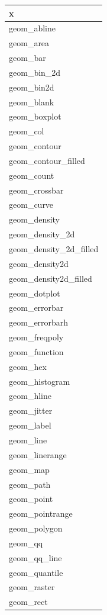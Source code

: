 \documentclass[
]{book}
\begin{document}
\begin{tabular}{l}
\hline
x\\
\hline
geom\_abline\\
\hline
geom\_area\\
\hline
geom\_bar\\
\hline
geom\_bin\_2d\\
\hline
geom\_bin2d\\
\hline
geom\_blank\\
\hline
geom\_boxplot\\
\hline
geom\_col\\
\hline
geom\_contour\\
\hline
geom\_contour\_filled\\
\hline
geom\_count\\
\hline
geom\_crossbar\\
\hline
geom\_curve\\
\hline
geom\_density\\
\hline
geom\_density\_2d\\
\hline
geom\_density\_2d\_filled\\
\hline
geom\_density2d\\
\hline
geom\_density2d\_filled\\
\hline
geom\_dotplot\\
\hline
geom\_errorbar\\
\hline
geom\_errorbarh\\
\hline
geom\_freqpoly\\
\hline
geom\_function\\
\hline
geom\_hex\\
\hline
geom\_histogram\\
\hline
geom\_hline\\
\hline
geom\_jitter\\
\hline
geom\_label\\
\hline
geom\_line\\
\hline
geom\_linerange\\
\hline
geom\_map\\
\hline
geom\_path\\
\hline
geom\_point\\
\hline
geom\_pointrange\\
\hline
geom\_polygon\\
\hline
geom\_qq\\
\hline
geom\_qq\_line\\
\hline
geom\_quantile\\
\hline
geom\_raster\\
\hline
geom\_rect\\

\end{tabular}
\end{document}
